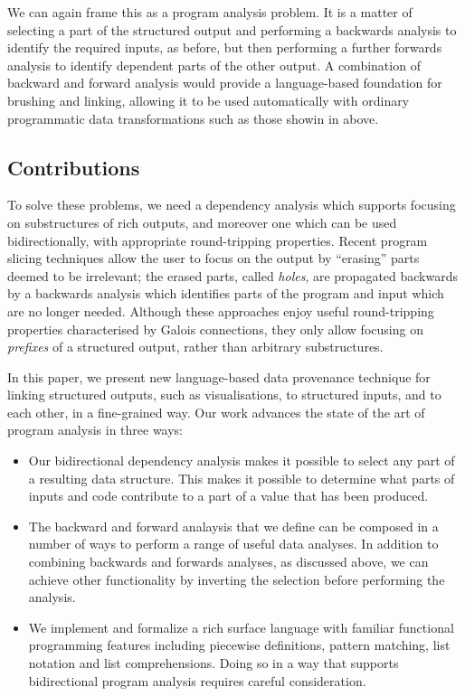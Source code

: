 We can again frame this as a program analysis problem. It is a matter of selecting a part of the structured output and performing a backwards analysis to identify the required inputs, as before, but then performing a further forwards analysis to identify dependent parts of the other output. A combination of backward and forward analysis would provide a language-based foundation for brushing and linking, allowing it to be used automatically with ordinary programmatic data transformations such as those showin in  above.

\subsection{Contributions}

To solve these problems, we need a dependency analysis which supports focusing on substructures of rich outputs, and moreover one which can be used bidirectionally, with appropriate round-tripping properties. Recent program slicing techniques \cite{perera12a,perera13a,ricciotti17} allow the user to focus on the output by ``erasing'' parts deemed to be irrelevant; the erased parts, called \emph{holes}, are propagated backwards by a backwards analysis which identifies parts of the program and input which are no longer needed. Although these approaches enjoy useful round-tripping properties characterised by Galois connections, they only allow focusing on \emph{prefixes} of a structured output, rather than arbitrary substructures.

In this paper, we present new language-based data provenance technique for linking structured outputs, such as visualisations, to structured inputs, and to each other, in a fine-grained way. Our work advances the state of the art of program analysis in three ways:

\begin{itemize}
\item Our bidirectional dependency analysis makes it possible to select any part of a resulting data structure. This makes it possible to determine what parts of inputs and code contribute to a part of a value that has been produced.
\item The backward and forward analaysis that we define can be composed in a number of ways to perform a range of useful data analyses. In addition to combining backwards and forwards analyses, as discussed above, we can achieve other functionality by inverting the selection before performing the analysis.
\item We implement and formalize a rich surface language with familiar functional programming features including piecewise definitions, pattern matching, list notation and list comprehensions. Doing so in a way that supports bidirectional program analysis requires careful consideration.
\end{itemize}

